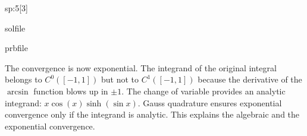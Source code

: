 \begin{samproblem}
\begin{subproblem}{sp:5}[3]
  \begin{samwriteprbpart}{solfile}
    \begin{writeverbatim}{prbfile}
      \begin{samsolution}
        The convergence is now exponential.
        The integrand of the original integral belongs to $C^0([-1,1])$ but not to $C^1([-1,1])$ 
        because the derivative of the $\arcsin$ function blows up in $\pm1$.
        The change of variable provides an analytic integrand: $x\cos(x)\sinh(\sin x)$.
        Gauss quadrature ensures exponential convergence only if the integrand is analytic.
        This explains the algebraic and the exponential convergence.
      \end{samsolution}
    \end{writeverbatim}
  \end{samwriteprbpart}

\end{subproblem}

\end{samproblem}
